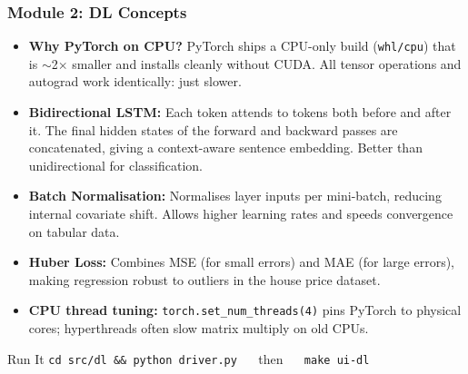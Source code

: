 \begin{frame}[fragile]\frametitle{Module 2: DL Concepts}
\begin{itemize}
  \item \textbf{Why PyTorch on CPU?} PyTorch ships a CPU-only build (\texttt{whl/cpu}) that is $\sim$2$\times$ smaller and installs cleanly without CUDA. All tensor operations and autograd work identically: just slower.
  \item \textbf{Bidirectional LSTM:} Each token attends to tokens both before and after it. The final hidden states of the forward and backward passes are concatenated, giving a context-aware sentence embedding. Better than unidirectional for classification.
  \item \textbf{Batch Normalisation:} Normalises layer inputs per mini-batch, reducing internal covariate shift. Allows higher learning rates and speeds convergence on tabular data.
  \item \textbf{Huber Loss:} Combines MSE (for small errors) and MAE (for large errors), making regression robust to outliers in the house price dataset.
  \item \textbf{CPU thread tuning:} \texttt{torch.set\_num\_threads(4)} pins PyTorch to physical cores; hyperthreads often slow matrix multiply on old CPUs.
\end{itemize}
\begin{block}{Run It}
  \texttt{cd src/dl \&\& python driver.py} $\quad$ then $\quad$ \texttt{make ui-dl}
\end{block}
\end{frame}

